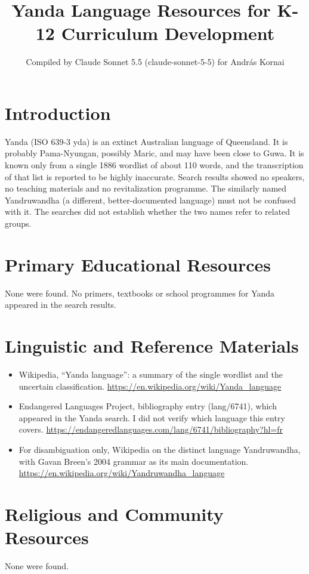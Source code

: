 \documentclass[12pt]{article}
\title{Yanda Language Resources for K-12 Curriculum Development}
\author{Compiled by Claude Sonnet 5.5 (claude-sonnet-5-5) for Andr\'as Kornai}
\date{}
\begin{document}
\maketitle

\section{Introduction}
Yanda (ISO 639-3 yda) is an extinct Australian language of Queensland. It is probably Pama-Nyungan, possibly Maric, and may have been close to Guwa. It is known only from a single 1886 wordlist of about 110 words, and the transcription of that list is reported to be highly inaccurate. Search results showed no speakers, no teaching materials and no revitalization programme. The similarly named Yandruwandha (a different, better-documented language) must not be confused with it. The searches did not establish whether the two names refer to related groups.

\section{Primary Educational Resources}
None were found. No primers, textbooks or school programmes for Yanda appeared in the search results.

\section{Linguistic and Reference Materials}
\begin{itemize}
\item Wikipedia, ``Yanda language'': a summary of the single wordlist and the uncertain classification. \url{https://en.wikipedia.org/wiki/Yanda_language}
\item Endangered Languages Project, bibliography entry (lang/6741), which appeared in the Yanda search. I did not verify which language this entry covers. \url{https://endangeredlanguages.com/lang/6741/bibliography?hl=fr}
\item For disambiguation only, Wikipedia on the distinct language Yandruwandha, with Gavan Breen's 2004 grammar as its main documentation. \url{https://en.wikipedia.org/wiki/Yandruwandha_language}
\end{itemize}

\section{Religious and Community Resources}
None were found.
\end{document}
